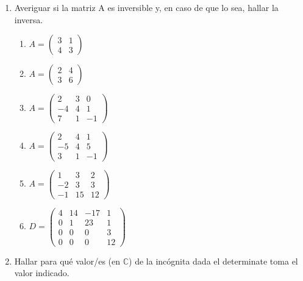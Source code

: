 \documentclass[a4paper]{article}
\newcommand{\exercise}{\item}
\begin{document}
\begin{enumerate}
\begin{multicols}{3}
\begin{enumerate} [label=(\alph*)]
		\item $\begin{vmatrix} ~2 & ~4 & ~0 & ~2 & ~0 \\ ~3 & ~0 & ~5 & ~1 & ~0 \\ ~0 & ~6 & ~2 & ~0 & ~3 \\ ~4 & ~0 & ~2 & ~0 & ~4 \\ ~0 & ~6 & ~1 & ~0 & ~2 \end{vmatrix}$
	\end{enumerate}
	\end{multicols}
	\exercise Averiguar si la matriz A es inversible y, en caso de que lo sea, hallar la inversa.
	\begin{multicols}{3}
	\begin{enumerate} [label=(\alph*)]
		\item $A=\begin{pmatrix} 3 & 1 \\ 4 & 3 \end{pmatrix}$
		\item $A=\begin{pmatrix} 2 & 4 \\ 3 & 6 \end{pmatrix}$
		\item $A=\begin{pmatrix} 2 & 3 & 0 \\ -4 & 4 & 1 \\ 7 & 1 & -1\end{pmatrix}$
		\item $A=\begin{pmatrix} 2 & 4 & 1 \\ -5 & 4 & 5 \\ 3 & 1 & -1\end{pmatrix}$
		\item $A=\begin{pmatrix} 1 & 3 & 2 \\ -2 & 3 & 3 \\ -1 & 15 & 12 \end{pmatrix}$
		\item $D=\begin{pmatrix} 4 & 14 & -17 & 1 \\ 0 & 1 & 23 & 1 \\ 0 & 0 & 0 & 3 \\ 0 & 0 & 0 & 12 \end{pmatrix}$
	\end{enumerate}
	\end{multicols}
	\exercise Hallar para qué valor/es (en $\mathbb{C}$) de la incógnita dada el determinate toma el valor indicado.

\end{enumerate}
\end{document}

